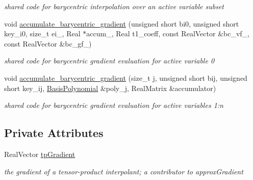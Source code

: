 \begin{DoxyCompactItemize}
\begin{DoxyCompactList}\small\item\em shared code for barycentric interpolation over an active variable subset \end{DoxyCompactList}\item 
void \hyperlink{classPecos_1_1SharedInterpPolyApproxData_af3de387fc4856a30cdf17fe72dfcd94a}{accumulate\+\_\+barycentric\+\_\+gradient} (unsigned short bi0, unsigned short key\+\_\+i0, size\+\_\+t ei\+\_, Real $\ast$accum\+\_, Real t1\+\_\+coeff, const Real\+Vector \&bc\+\_\+vf\+\_, const Real\+Vector \&bc\+\_\+gf\+\_)\label{classPecos_1_1SharedInterpPolyApproxData_af3de387fc4856a30cdf17fe72dfcd94a}

\begin{DoxyCompactList}\small\item\em shared code for barycentric gradient evaluation for active variable 0 \end{DoxyCompactList}\item 
void \hyperlink{classPecos_1_1SharedInterpPolyApproxData_ad7ae4f0344220d14a39976defafd2bc1}{accumulate\+\_\+barycentric\+\_\+gradient} (size\+\_\+t j, unsigned short bij, unsigned short key\+\_\+ij, \hyperlink{classPecos_1_1BasisPolynomial}{Basis\+Polynomial} \&poly\+\_\+j, Real\+Matrix \&accumulator)\label{classPecos_1_1SharedInterpPolyApproxData_ad7ae4f0344220d14a39976defafd2bc1}

\begin{DoxyCompactList}\small\item\em shared code for barycentric gradient evaluation for active variables 1\+:n \end{DoxyCompactList}\end{DoxyCompactItemize}
\subsection*{Private Attributes}
\begin{DoxyCompactItemize}
\item 
Real\+Vector \hyperlink{classPecos_1_1SharedInterpPolyApproxData_a213e5944dbdea6145f990213101c333b}{tp\+Gradient}\label{classPecos_1_1SharedInterpPolyApproxData_a213e5944dbdea6145f990213101c333b}

\begin{DoxyCompactList}\small\item\em the gradient of a tensor-\/product interpolant; a contributor to approx\+Gradient \end{DoxyCompactList}\end{DoxyCompactItemize}
